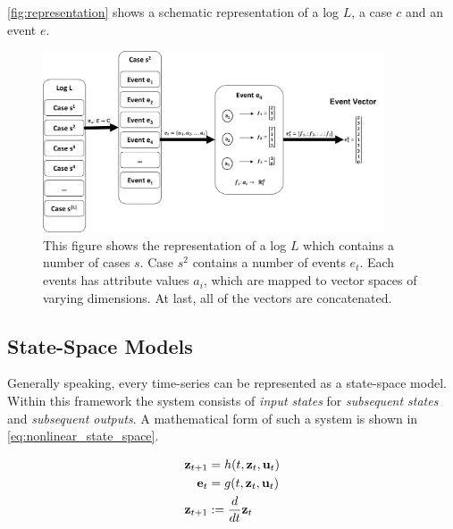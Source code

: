 \documentclass[./../../paper.tex]{subfiles}
\begin{document}
\autoref{fig:representation} shows a schematic representation of a log $L$, a case $c$ and an event $e$.


\begin{figure}[htbp]
    \centering
    \includegraphics[width=0.9\textwidth]{figures/Graphics/Slide4.PNG}
    \caption{This figure shows the representation of a log $L$ which contains a number of cases $s$. Case $s^2$ contains a number of events $e_t$. Each events has attribute values $a_i$, which are mapped to vector spaces of varying dimensions. At last, all of the vectors are concatenated.}
    \label{fig:representation}
\end{figure}




\subsection{State-Space Models}
Generally speaking, every time-series can be represented as a state-space model\cite{kalman_NewApproachLinear_1960}. Within this framework the system consists of \emph{input states} for \emph{subsequent states} and \emph{subsequent outputs}. A mathematical form of such a system is shown in \autoref{eq:nonlinear_state_space}.

\begin{align}
    \label{eq:nonlinear_state_space}
    \mathbf{z}_{t+1} & =h(t, \mathbf{z}_t, \mathbf{u}_t)           \\
    \mathbf{e}_t   & =g(t, \mathbf{z}_t, \mathbf{u}_t) \nonumber \\
    \mathbf{z}_{t+1} &:=\frac{d}{d t} \mathbf{z}_t \nonumber
\end{align}
\end{document}
